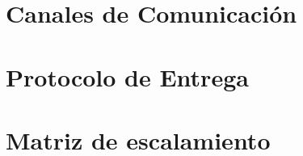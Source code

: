 


\section{Canales de Comunicación}


\section{Protocolo de Entrega}


\section{Matriz de escalamiento}
